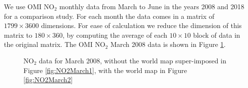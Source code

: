 \documentclass[11pt]{article}
\begin{document}
	We use OMI $\text{NO}_2$ monthly data from March to June in the years 2008 and 2018 for a comparison study. For each month the data comes in a matrix of $1799 \times 3600 $ dimensions. For ease of calculation we reduce the dimension of this matrix to $180 \times 360 $, by computing the average of each $10 \times 10$ block of data in the original matrix. The OMI $\text{NO}_2$ March 2008 data is shown in Figure \ref{fig:NO2March2008}. 

	\begin{figure}[H]
		\centering
		\caption{\footnotesize $\text{NO}_2$ data for March 2008, without the world map super-imposed in Figure \ref{fig:NO2March1}, with the world map in Figure \ref{fig:NO2March2} }
		\label{fig:NO2March2008}
	\end{figure}
\end{document}
